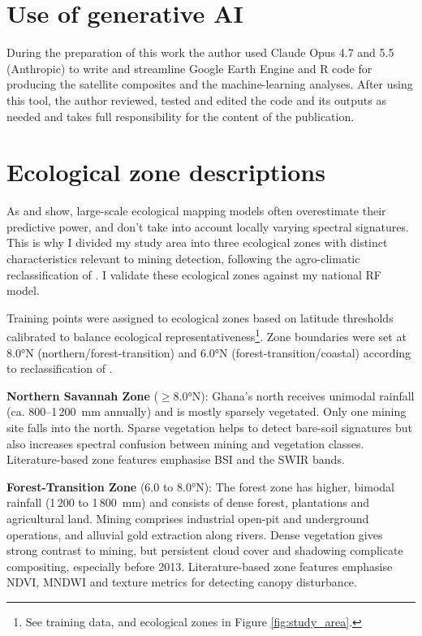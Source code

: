 \documentclass[]{interact}
\begin{document}
\section*{Use of generative AI}
During the preparation of this work the author used Claude Opus 4.7 and 5.5
(Anthropic) to write and streamline Google Earth Engine and R code for producing the
satellite composites and the machine-learning analyses. After using this
tool, the author reviewed, tested and edited the code and its outputs as
needed and takes full responsibility for the content of the publication.


 

\section{Ecological zone descriptions}
\label{app:zones}
As \citet{ploton2020Spatial} and \citet{zhang2026Geographical} show, large-scale ecological mapping models often overestimate their predictive power, and don't take into account locally varying spectral signatures. This is why I divided my study area into three ecological zones with distinct characteristics relevant to mining detection, following the agro-climatic reclassification of \citet{yamba2023Revisiting}. I validate these ecological zones against my national RF model.

Training points were assigned to ecological zones based on latitude thresholds calibrated to balance ecological representativeness\footnote{See training data, and ecological zones in Figure \ref{fig:study_area}.}. Zone boundaries were set at 8.0°N (northern/forest-transition) and 6.0°N (forest-transition/coastal) according to reclassification of \citet{yamba2023Revisiting}.

\textbf{Northern Savannah Zone} ($\geq$8.0°N): Ghana's north receives
unimodal rainfall (ca. 800--1\,200~mm annually) and is mostly sparsely
vegetated. Only one mining site falls into the north. Sparse vegetation helps to detect bare-soil
signatures but also increases spectral confusion between mining and
vegetation classes. Literature-based zone features emphasise BSI and the
SWIR bands.

\textbf{Forest-Transition Zone} (6.0 to 8.0°N): The forest zone has higher,
bimodal rainfall (1\,200 to 1\,800~mm) and consists of dense forest,
plantations and agricultural land. Mining comprises industrial open-pit and underground
operations, and alluvial gold extraction along rivers. Dense vegetation gives
strong contrast to mining, but persistent cloud cover and shadowing
complicate compositing, especially before 2013. Literature-based zone
features emphasise NDVI, MNDWI and texture metrics for detecting canopy
disturbance.
\end{document}
